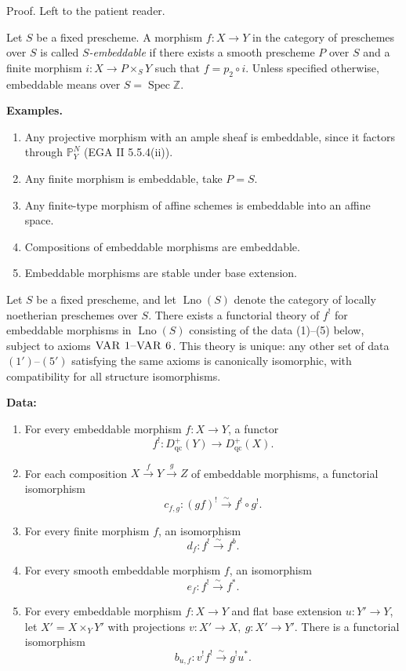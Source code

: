 \setcounter{page}{189}
Proof. Left to the patient reader.

\begin{definition}
Let \(S\) be a fixed prescheme. A morphism \(f\colon X\to Y\) in the category of preschemes over \(S\) is called \textit{\(S\)-embeddable} if there exists a smooth prescheme \(P\) over \(S\) and a finite morphism \(i\colon X\to P\times_S Y\) such that \(f = p_2\circ i\). Unless specified otherwise, embeddable means over \(S=\operatorname{Spec}\mathbb{Z}\).
\end{definition}

\noindent\textbf{Examples.}
\begin{enumerate}
\item Any projective morphism with an ample sheaf is embeddable, since it factors through \(\mathbb{P}_Y^N\) (EGA II 5.5.4(ii)).
\item Any finite morphism is embeddable, take \(P=S\).
\item Any finite-type morphism of affine schemes is embeddable into an affine space.
\item Compositions of embeddable morphisms are embeddable.
\item Embeddable morphisms are stable under base extension.
\end{enumerate}

\setcounter{page}{190}
\begin{theorem}
Let \(S\) be a fixed prescheme, and let \(\operatorname{Lno}(S)\) denote the category of locally noetherian preschemes over \(S\). There exists a functorial theory of \(f^!\) for embeddable morphisms in \(\operatorname{Lno}(S)\) consisting of the data (1)--(5) below, subject to axioms \(\textsc{VAR 1--VAR 6}\). This theory is unique: any other set of data \((1')\)--\((5')\) satisfying the same axioms is canonically isomorphic, with compatibility for all structure isomorphisms.
\end{theorem}

\noindent\textbf{Data:}
\begin{enumerate}
\item For every embeddable morphism \(f\colon X\to Y\), a functor
\[
f^!\colon D_{\mathrm{qc}}^+(Y) \to D_{\mathrm{qc}}^+(X).
\]

\item For each composition \(X\xrightarrow{f}Y\xrightarrow{g}Z\) of embeddable morphisms, a functorial isomorphism
\[
c_{f,g}\colon (gf)^! \stackrel{\sim}{\to} f^!\circ g^!.
\]

\item For every finite morphism \(f\), an isomorphism
\[
d_f\colon f^! \stackrel{\sim}{\to} f^b.
\]

\item For every smooth embeddable morphism \(f\), an isomorphism
\[
e_f\colon f^! \stackrel{\sim}{\to} f^*.
\]
\setcounter{page}{191}
\item For every embeddable morphism \(f\colon X\to Y\) and flat base extension \(u\colon Y'\to Y\), let \(X'=X\times_Y Y'\) with projections \(v\colon X'\to X,\ g\colon X'\to Y'\). There is a functorial isomorphism
\[
b_{u,f}\colon v^! f^! \stackrel{\sim}{\to} g^! u^*.
\]
\end{enumerate}

